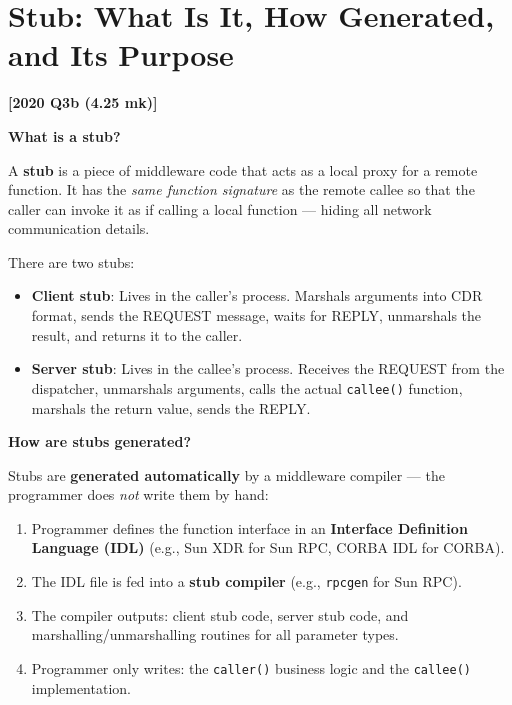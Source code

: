 \documentclass[11pt,a4paper]{article}
\newcommand{\qref}[1]{\textbf{\textcolor{examblue}{[#1]}}}
\newcommand{\mk}[1]{\textcolor{slidegray}{\small(#1 mk)}}
\newcommand{\key}[1]{\textbf{\textcolor{keyred}{#1}}}
\begin{document}
\section{Stub: What Is It, How Generated, and Its Purpose}
\qref{2020 Q3b \mk{4.25}}

\begin{answerbox}
\textbf{What is a stub?}

A \key{stub} is a piece of middleware code that acts as a local proxy for a remote function. It has the \emph{same function signature} as the remote callee so that the caller can invoke it as if calling a local function --- hiding all network communication details.

There are two stubs:
\begin{itemize}
  \item \textbf{Client stub}: Lives in the caller's process. Marshals arguments into CDR format, sends the REQUEST message, waits for REPLY, unmarshals the result, and returns it to the caller.
  \item \textbf{Server stub}: Lives in the callee's process. Receives the REQUEST from the dispatcher, unmarshals arguments, calls the actual \texttt{callee()} function, marshals the return value, sends the REPLY.
\end{itemize}

\textbf{How are stubs generated?}

Stubs are \key{generated automatically} by a middleware compiler --- the programmer does \emph{not} write them by hand:
\begin{enumerate}
  \item Programmer defines the function interface in an \textbf{Interface Definition Language (IDL)} (e.g., Sun XDR for Sun RPC, CORBA IDL for CORBA).
  \item The IDL file is fed into a \textbf{stub compiler} (e.g., \texttt{rpcgen} for Sun RPC).
  \item The compiler outputs: client stub code, server stub code, and marshalling/unmarshalling routines for all parameter types.
  \item Programmer only writes: the \texttt{caller()} business logic and the \texttt{callee()} implementation.
\end{enumerate}


\end{answerbox}
\end{document}
